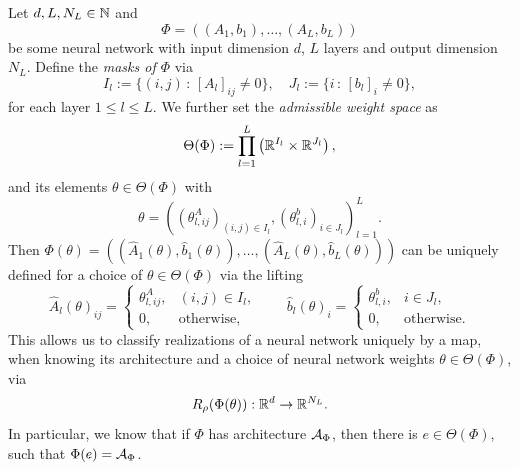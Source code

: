 \begin{definition} \label{def: neural network weights}
    Let $d, L, N_L \in \mathbb{N}$ and 
    \begin{equation*}
        \Phi = \left((A_1, b_1), \dots, (A_L, b_L)\right)
    \end{equation*}
    be some neural network with input dimension $d$, $L$ layers and output dimension $N_L$.
    Define the \emph{masks of $\Phi$} via
    \begin{equation*}
        I_l := \{ (i, j) \, : \, [A_l]_{ij} \neq 0 \}, \quad J_l := \{i \, : \, [b_l]_i \neq 0 \},
    \end{equation*}
    for each layer $1 \leq l \leq L$. We further set the \emph{admissible weight space} as
    \begin{equation*}
        \Theta(\Phi) := \prod_{l=1}^L \left( \mathbb{R}^{I_l} \times \mathbb{R}^{J_l} \right),
    \end{equation*}
    and its elements $\theta \in \Theta(\Phi)$ with
    \begin{equation*}
        \theta = \left( (\theta_{l, ij}^A)_{(i, j) \in I_l}, (\theta_{l, i}^b)_{i \in J_l} \right)_{l=1}^L.
    \end{equation*}
    Then $\Phi(\theta) = 
    ((\hat A_1(\theta), \hat b_1(\theta)), \dots, (\hat A_L(\theta), \hat b_L(\theta)))$
    can be uniquely defined for a choice of $\theta \in \Theta(\Phi)$ via the lifting
    \begin{equation*}
        \hat A_l(\theta)_{ij} = 
        \begin{cases}
            \theta^A_{l,ij}, & (i,j)\in I_l,\\
            0, & \text{otherwise},
        \end{cases}
        \qquad
        \hat b_l(\theta)_{i} =
        \begin{cases}
            \theta^b_{l,i}, & i\in J_l,\\
            0, & \text{otherwise}.
        \end{cases}
    \end{equation*}
    This allows us to classify realizations of a neural network uniquely by
    a map, when knowing
    its architecture and a choice of neural network weights 
    $\theta \in \Theta(\Phi)$, via
    \begin{equation*}
        R_\rho(\Phi(\theta)) : \mathbb{R}^d \to \mathbb{R}^{N_L}.
    \end{equation*}
    In particular, we know that if $\Phi$ has architecture $\mathcal{A}_\Phi$, then there is $e \in \Theta(\Phi)$,
    such that $\Phi(e) = \mathcal{A}_\Phi$.
\end{definition}

